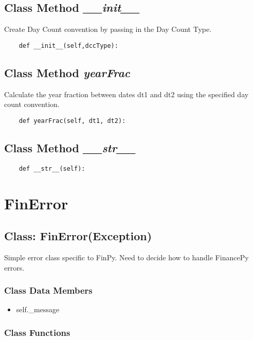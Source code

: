 \documentclass[twoside,11pt]{book}
\begin{document}
\subsection{Class Method {\it \_\_init\_\_}}
Create Day Count convention by passing in the Day Count Type. 

\begin{lstlisting}
    def __init__(self,dccType):
\end{lstlisting}

\subsection{Class Method {\it yearFrac}}
Calculate the year fraction between dates dt1 and dt2 using the specified day count convention. 

\begin{lstlisting}
    def yearFrac(self, dt1, dt2):
\end{lstlisting}

\subsection{Class Method {\it \_\_str\_\_}}


\begin{lstlisting}
    def __str__(self):
\end{lstlisting}

\newpage
\section{FinError}

\subsection{Class: FinError(Exception)}
Simple error class specific to FinPy. Need to decide how to handle FinancePy errors. 

\subsubsection{Class Data Members}
\begin{itemize}
\item{self.\_message}
\end{itemize}

\subsubsection{Class Functions}
\end{document}
